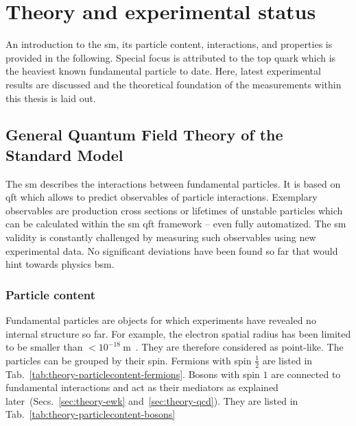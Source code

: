 \chapter{Theory and experimental status}

An introduction to the \gls{sm}, its particle content, interactions, and properties is provided in the following. Special focus is attributed to the top quark which is the heaviest known fundamental particle to date. Here, latest experimental results are discussed and the theoretical foundation of the measurements within this thesis is laid out.


\section{General Quantum Field Theory of the Standard Model}

The \gls{sm} describes the interactions between fundamental particles. It is based on \gls{qft} which allows to predict observables of particle interactions. Exemplary observables are production cross sections or lifetimes of unstable particles which can be calculated within the \gls{sm} \gls{qft} framework -- even fully automatized. The \gls{sm} validity is constantly challenged by measuring such observables using new experimental data. No significant deviations have been found so far that would hint towards physics \gls{bsm}.


\subsection{Particle content}

Fundamental particles are objects for which experiments have revealed no internal structure so far. For example, the electron spatial radius has been limited to be smaller than $<10^{-18}~\mathrm{m}$~\cite{PhysRevLett.97.030801}. They are therefore considered as point-like. The particles can be grouped by their spin. Fermions with spin $\frac{1}{2}$ are listed in Tab.~\ref{tab:theory-particlecontent-fermions}. Bosons with spin $1$ are connected to fundamental interactions and act as their mediators as explained later~(Secs.~\ref{sec:theory-ewk} and~\ref{sec:theory-qcd}). They are listed in Tab.~\ref{tab:theory-particlecontent-bosons}


